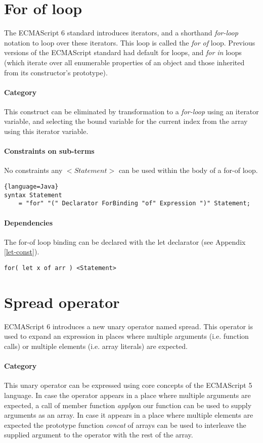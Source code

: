 \section{For of loop}
The ECMAScript 6 standard introduces iterators, and a shorthand \textit{for-loop} notation to loop over these iterators. This loop is called the \textit{for of} loop\cite[13.6.4]{SpecJS}. Previous versions of the ECMAScript standard had default for loops, and \textit{for in} loops (which iterate over all enumerable properties of an object and those inherited from its constructor's prototype).

\paragraph{Category}
This construct can be eliminated by transformation to a \textit{for-loop} using an iterator variable, and selecting the bound variable for the current index from the array using this iterator variable.

\paragraph{Constraints on sub-terms}
No constraints any $<Statement>$ can be used within the body of a for-of loop.

\begin{lstlisting}{language=Java}
syntax Statement
	= "for" "(" Declarator ForBinding "of" Expression ")" Statement;
\end{lstlisting}

\paragraph{Dependencies}
The for-of loop binding can be declared with the let declarator (see Appendix \ref{let-const}).

\begin{lstlisting}
for( let x of arr ) <Statement>
\end{lstlisting}


\section{Spread operator}
ECMAScript 6 introduces a new unary operator named spread\cite[12.3.6.1]{SpecJS}. This operator is used to expand an expression in places where multiple arguments (i.e. function calls) or multiple elements (i.e. array literals) are expected.

\paragraph{Category}
This unary operator can be expressed using core concepts of the ECMAScript 5 language. In case the operator appears in a place where multiple arguments are expected, a call of member function \textit{apply}\footnotemark on our function can be used to supply arguments as an array. In case it appears in a place where multiple elements are expected the prototype function \textit{concat} of arrays can be used to interleave the supplied argument to the operator with the rest of the array.

